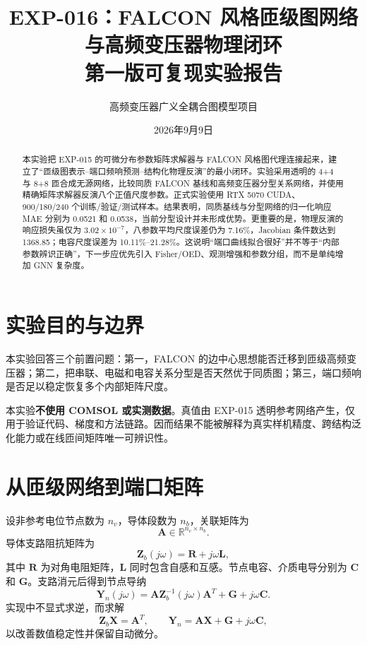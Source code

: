 \documentclass[10pt,a4paper]{ctexart}
\title{EXP-016：FALCON 风格匝级图网络与高频变压器物理闭环\\\large 第一版可复现实验报告}
\author{高频变压器广义全耦合图模型项目}
\date{2026年9月9日}
\begin{document}
\maketitle
\begin{abstract}
本实验把 EXP-015 的可微分布参数矩阵求解器与 FALCON 风格图代理连接起来，建立了“匝级图表示--端口频响预测--结构化物理反演”的最小闭环。实验采用透明的 4+4 与 8+8 匝合成无源网络，比较同质 FALCON 基线和高频变压器分型关系网络，并使用精确矩阵求解器反演八个正值尺度参数。正式实验使用 RTX 5070 CUDA、900/180/240 个训练/验证/测试样本。结果表明，同质基线与分型网络的归一化响应 MAE 分别为 0.0521 和 0.0538，当前分型设计并未形成优势。更重要的是，物理反演的响应损失虽仅为 $3.02\times10^{-7}$，八参数平均尺度误差仍为 7.16\%，Jacobian 条件数达到 1368.85；电容尺度误差为 10.11\%--21.28\%。这说明“端口曲线拟合很好”并不等于“内部参数辨识正确”，下一步应优先引入 Fisher/OED、观测增强和参数分组，而不是单纯增加 GNN 复杂度。
\end{abstract}

\section{实验目的与边界}
本实验回答三个前置问题：第一，FALCON 的边中心思想能否迁移到匝级高频变压器；第二，把串联、电磁和电容关系分型是否天然优于同质图；第三，端口频响是否足以稳定恢复多个内部矩阵尺度。

本实验\textbf{不使用 COMSOL 或实测数据}。真值由 EXP-015 透明参考网络产生，仅用于验证代码、梯度和方法链路。因而结果不能被解释为真实样机精度、跨结构泛化能力或在线匝间矩阵唯一可辨识性。

\section{从匝级网络到端口矩阵}
设非参考电位节点数为 $n_v$，导体段数为 $n_b$，关联矩阵为
\begin{equation}
 \bm A\in\mathbb{R}^{n_v\times n_b}.
\end{equation}
导体支路阻抗矩阵为
\begin{equation}
 \bm Z_b(j\omega)=\bm R+j\omega\bm L,
\end{equation}
其中 $\bm R$ 为对角电阻矩阵，$\bm L$ 同时包含自感和互感。节点电容、介质电导分别为 $\bm C$ 和 $\bm G$。支路消元后得到节点导纳
\begin{equation}
 \boxed{\bm Y_n(j\omega)=\bm A\bm Z_b^{-1}(j\omega)\bm A^T+\bm G+j\omega\bm C.}
\end{equation}
实现中不显式求逆，而求解
\begin{equation}
 \bm Z_b\bm X=\bm A^T,\qquad \bm Y_n=\bm A\bm X+\bm G+j\omega\bm C,
\end{equation}
以改善数值稳定性并保留自动微分。
\end{document}

